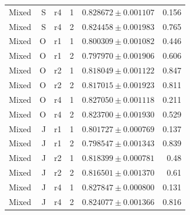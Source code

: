 {\begin{longtable}{lrrrrr}
Mixed & S & r4 & 1 & $0.828672\pm0.001107$ & 0.156\\
Mixed & S & r4 & 2 & $0.824458\pm0.001983$ & 0.765\\
Mixed & O & r1 & 1 & $0.800309\pm0.001082$ & 0.446\\
Mixed & O & r1 & 2 & $0.797970\pm0.001906$ & 0.606\\
Mixed & O & r2 & 1 & $0.818049\pm0.001122$ & 0.847\\
Mixed & O & r2 & 2 & $0.817015\pm0.001923$ & 0.811\\
Mixed & O & r4 & 1 & $0.827050\pm0.001118$ & 0.211\\
Mixed & O & r4 & 2 & $0.823700\pm0.001930$ & 0.529\\
Mixed & J & r1 & 1 & $0.801727\pm0.000769$ & 0.137\\
Mixed & J & r1 & 2 & $0.798547\pm0.001343$ & 0.839\\
Mixed & J & r2 & 1 & $0.818399\pm0.000781$ & 0.48\\
Mixed & J & r2 & 2 & $0.816501\pm0.001370$ & 0.61\\
Mixed & J & r4 & 1 & $0.827847\pm0.000800$ & 0.131\\
Mixed & J & r4 & 2 & $0.824077\pm0.001366$ & 0.816\\
\end{longtable}}
